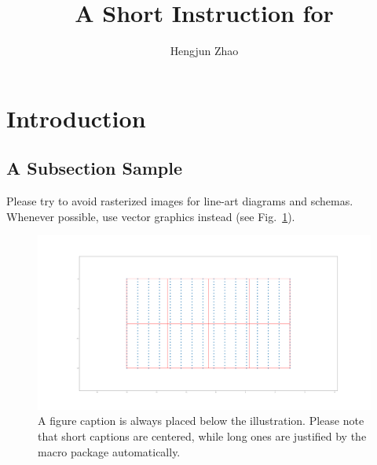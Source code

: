 \documentclass{llncs}
\begin{document}
%
\title{A Short Instruction for }
%
%
\author{Hengjun Zhao}

%
\maketitle %
%
%
%
\section{Introduction}
\subsection{A Subsection Sample}

Please \cite{Prajna04safetyverification} try to avoid rasterized images for line-art diagrams and
schemas. Whenever possible, use vector graphics instead (see
Fig.~\ref{fig1}).

\begin{figure}
\includegraphics[width=\textwidth]{./fig/batch_data}
\caption{A figure caption is always placed below the illustration.
Please note that short captions are centered, while long ones are
justified by the macro package automatically.} \label{fig1}
\end{figure}
\end{document}
